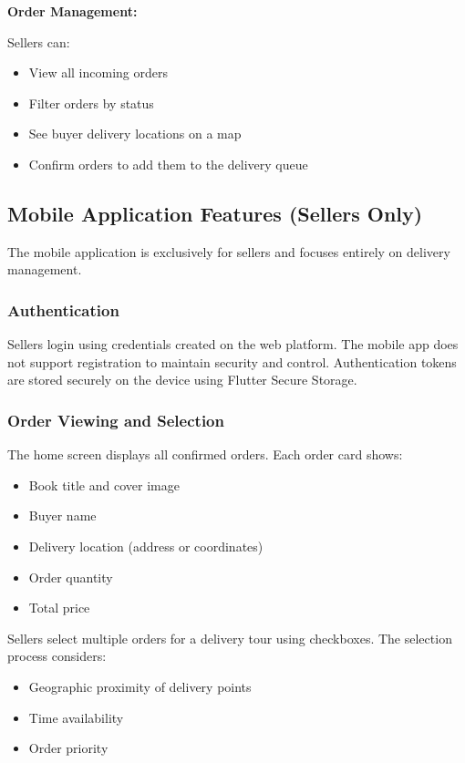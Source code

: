 \documentclass[12pt,a4paper]{article}
\begin{document}
\textbf{Order Management:}

Sellers can:
\begin{itemize}
    \item View all incoming orders
    \item Filter orders by status
    \item See buyer delivery locations on a map
    \item Confirm orders to add them to the delivery queue
\end{itemize}

\subsection{Mobile Application Features (Sellers Only)}

The mobile application is exclusively for sellers and focuses entirely on delivery management.

\subsubsection{Authentication}

Sellers login using credentials created on the web platform. The mobile app does not support registration to maintain security and control. Authentication tokens are stored securely on the device using Flutter Secure Storage.

\subsubsection{Order Viewing and Selection}

The home screen displays all confirmed orders. Each order card shows:
\begin{itemize}
    \item Book title and cover image
    \item Buyer name
    \item Delivery location (address or coordinates)
    \item Order quantity
    \item Total price
\end{itemize}

Sellers select multiple orders for a delivery tour using checkboxes. The selection process considers:
\begin{itemize}
    \item Geographic proximity of delivery points
    \item Time availability
    \item Order priority
\end{itemize}
\end{document}
